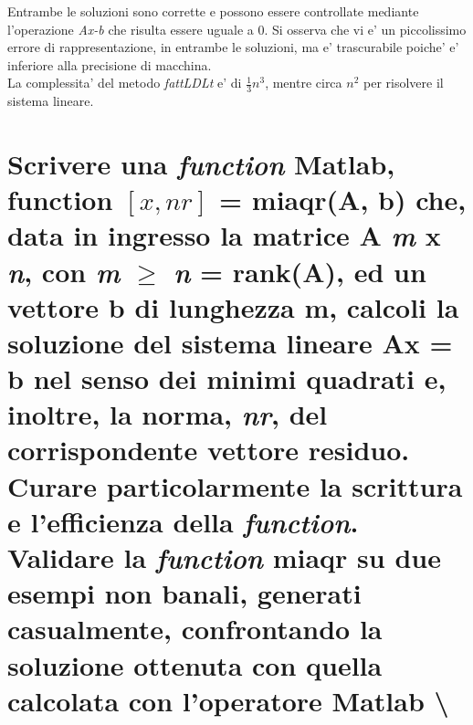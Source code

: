 \documentclass[10pt,a4paper]{article}
\begin{document}
Entrambe le soluzioni sono corrette e possono essere controllate mediante l'operazione \textit{Ax-b} che risulta
essere uguale a 0. Si osserva che vi e' un piccolissimo errore di rappresentazione, in entrambe le soluzioni,
ma e' trascurabile poiche' e' inferiore alla precisione di macchina.
\\
La complessita' del metodo \textit{fattLDLt} e' di $ \frac{1}{3}n^3 $, mentre circa $ n^2 $ per risolvere
il sistema lineare.

\section{Scrivere una \textit{function} Matlab, function $ [x, nr] $ = miaqr(A, b) che, data in ingresso
  la matrice A \textit{m} x \textit{n}, con \textit{m} $ \ge $ \textit{n} = rank(A), ed un vettore \textbf{b} di lunghezza m,
  calcoli la soluzione del sistema lineare A\textbf{x} = \textbf{b} nel senso dei minimi quadrati e, inoltre,
  la norma, \textit{nr}, del corrispondente vettore residuo. Curare particolarmente la scrittura e l'efficienza
  della \textit{function}. Validare la \textit{function} \textbf{miaqr} su due esempi non banali, generati
  casualmente, confrontando la soluzione ottenuta con quella calcolata con l'operatore Matlab \textbackslash}
\end{document}
